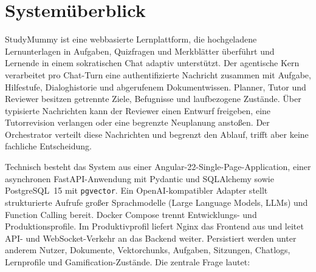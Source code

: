 \section{Systemüberblick}
\label{sec:systemueberblick}

StudyMummy ist eine webbasierte Lernplattform, die hochgeladene Lernunterlagen
in Aufgaben, Quizfragen und Merkblätter überführt und Lernende in einem
sokratischen Chat adaptiv unterstützt. Der agentische Kern verarbeitet pro Chat-Turn eine
authentifizierte Nachricht zusammen mit Aufgabe, Hilfestufe, Dialoghistorie und
abgerufenem Dokumentwissen. Planner, Tutor und Reviewer besitzen getrennte
Ziele, Befugnisse und laufbezogene Zustände. Über typisierte Nachrichten kann
der Reviewer einen Entwurf freigeben, eine Tutorrevision verlangen oder eine
begrenzte Neuplanung anstoßen. Der Orchestrator verteilt diese Nachrichten und
begrenzt den Ablauf, trifft aber keine fachliche Entscheidung.

Technisch besteht das System aus einer Angular-22-Single-Page-Application,
einer asynchronen FastAPI-Anwendung mit Pydantic und SQLAlchemy sowie
PostgreSQL~15 mit \texttt{pgvector}. Ein OpenAI-kompatibler Adapter stellt
strukturierte Aufrufe großer Sprachmodelle (Large Language Models, LLMs) und
Function Calling bereit. Docker Compose trennt Entwicklungs- und
Produktionsprofile. Im Produktivprofil liefert Nginx das
Frontend aus und leitet API- und WebSocket-Verkehr an das Backend weiter.
Persistiert werden unter anderem Nutzer, Dokumente, Vektorchunks, Aufgaben,
Sitzungen, Chatlogs, Lernprofile und Gamification-Zustände. Die zentrale Frage
lautet: \emph{\Forschungsfrage}
